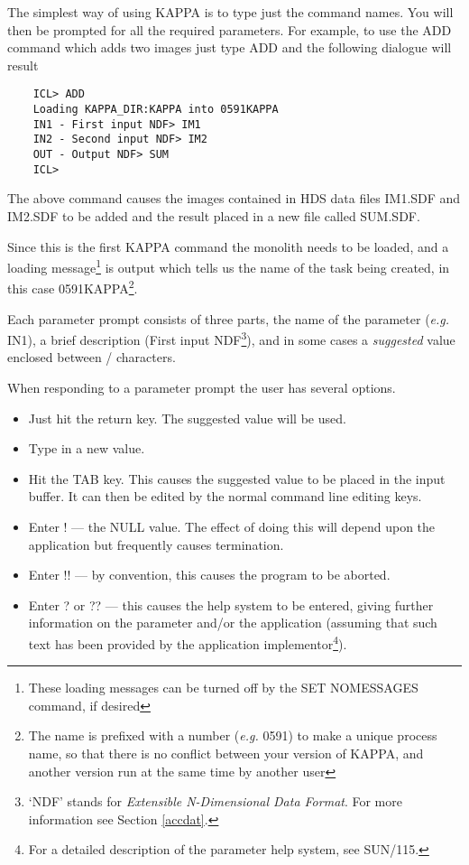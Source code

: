 The simplest way of using KAPPA is to type just the command names. You will
then be prompted for all the required parameters. For example, to use the
ADD command which adds two images just type ADD and the following dialogue
will result

\begin{verbatim}
    ICL> ADD
    Loading KAPPA_DIR:KAPPA into 0591KAPPA
    IN1 - First input NDF> IM1
    IN2 - Second input NDF> IM2
    OUT - Output NDF> SUM
    ICL>
\end{verbatim}

The above command causes the images contained in HDS data files IM1.SDF
and IM2.SDF to be added and the result placed in a new file called SUM.SDF.

Since this is the first KAPPA command the monolith needs to be loaded, and a
loading message\footnote{These loading messages can be turned off by the SET
NOMESSAGES command, if desired} is output which tells us the name of the task
being created, in this case 0591KAPPA\footnote{The name is prefixed with a
number ({\em e.g.} 0591) to make a unique process name, so that there is no conflict
between your version of KAPPA, and another version run at the same time by
another user}. 

Each parameter prompt consists of three parts, the name of the
parameter ({\em e.g.} IN1), a brief description (First input NDF\footnote{ 
`NDF' stands for {\em Extensible N-Dimensional Data Format}. For more
information see Section \ref{accdat}.}), and in some
cases a {\em suggested} value enclosed between / characters.

When responding to a parameter prompt the user has several options.
\begin{itemize}

\item Just hit the return key. The suggested value will be used.

\item Type in a new value.

\item Hit the TAB key. This causes the suggested value to be placed in the
input buffer. It can then be edited by the normal command line editing keys.
                                                                   
\item Enter ! --- the NULL value. The effect of doing this will depend upon
the application but frequently causes termination.

\item Enter !! --- by convention, this causes the program to be aborted.

\item Enter ? or ?? --- this causes the help system to be entered,
giving further information on the parameter and/or the application
(assuming that such text has been provided by the application 
implementor\footnote{For a detailed description of the parameter help system,
see SUN/115.}).
\end{itemize}                                                     

